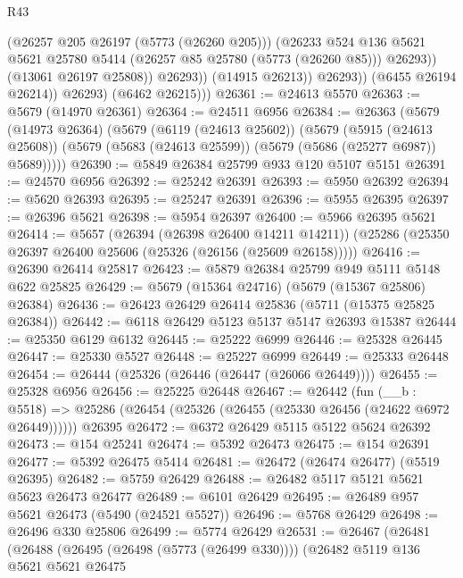 \begin{lexlean}{R43}
\begin{coremodule}
                          (@26257 @205 @26197 (@5773 (@26260 @205)))
                          (@26233
                            @524
                            @136
                            @5621
                            @5621
                            @25780
                            @5414
                            (@26257 @85 @25780 (@5773 (@26260 @85)))
                            @26293))
                        (@13061 @26197 @25808))
                      @26293))
                  (@14915 @26213))
                @26293))
            (@6455 @26194 @26214))
          @26293)
        (@6462 @26215)))
@26361 := @24613 @5570
@26363 := @5679 (@14970 @26361)
@26364 := @24511 @6956
@26384 := @26363
    (@5679
      (@14973 @26364)
      (@5679
        (@6119 (@24613 @25602))
        (@5679
          (@5915 (@24613 @25608))
          (@5679 (@5683 (@24613 @25599)) (@5679 (@5686 (@25277 @6987)) @5689)))))
@26390 := @5849 @26384 @25799 @933 @120 @5107 @5151
@26391 := @24570 @6956
@26392 := @25242 @26391
@26393 := @5950 @26392
@26394 := @5620 @26393
@26395 := @25247 @26391
@26396 := @5955 @26395
@26397 := @26396 @5621
@26398 := @5954 @26397
@26400 := @5966 @26395 @5621
@26414 := @5657
    (@26394 (@26398 @26400 @14211 @14211))
    (@25286 (@25350 @26397 @26400 @25606 (@25326 (@26156 (@25609 @26158)))))
@26416 := @26390 @26414 @25817
@26423 := @5879 @26384 @25799 @949 @5111 @5148 @622 @25825
@26429 := @5679 (@15364 @24716) (@5679 (@15367 @25806) @26384)
@26436 := @26423 @26429 @26414 @25836 (@5711 (@15375 @25825 @26384))
@26442 := @6118 @26429 @5123 @5137 @5147 @26393 @15387
@26444 := @25350 @6129 @6132
@26445 := @25222 @6999
@26446 := @25328 @26445
@26447 := @25330 @5527
@26448 := @25227 @6999
@26449 := @25333 @26448
@26454 := @26444 (@25326 (@26446 (@26447 (@26066 @26449))))
@26455 := @25328 @6956
@26456 := @25225 @26448
@26467 := @26442
    (fun (__b : @5518) => @25286 (@26454 (@25326 (@26455 (@25330 @26456 (@24622 @6972 @26449))))))
    @26395
@26472 := @6372 @26429 @5115 @5122 @5624 @26392
@26473 := @154 @25241
@26474 := @5392 @26473
@26475 := @154 @26391
@26477 := @5392 @26475 @5414
@26481 := @26472 (@26474 @26477) (@5519 @26395)
@26482 := @5759 @26429
@26488 := @26482 @5117 @5121 @5621 @5623 @26473 @26477
@26489 := @6101 @26429
@26495 := @26489 @957 @5621 @26473 (@5490 (@24521 @5527))
@26496 := @5768 @26429
@26498 := @26496 @330 @25806
@26499 := @5774 @26429
@26531 := @26467
    (@26481
      (@26488
        (@26495 (@26498 (@5773 (@26499 @330))))
        (@26482
          @5119
          @136
          @5621
          @5621
          @26475

\end{coremodule}
\end{lexlean}

